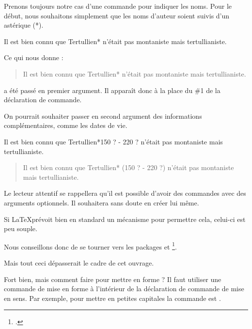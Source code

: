 Prenons toujours notre cas d'une commande pour indiquer les noms. Pour le début, nous souhaitons simplement que les noms d'auteur soient suivis d'un astérique (*).

\begin{latexcode}
\newcommand{\auteur}[1]{#1*}
Il est bien connu que \auteur{Tertullien} n'était pas montaniste
mais tertullianiste.
\end{latexcode}

\newcommand{\auteur}[1]{#1*}

Ce qui nous donne :

\begin{quotation}
Il est bien connu que \auteur{Tertullien} n'était pas montaniste mais tertullianiste.
\end{quotation}


 a été passé en premier argument. Il apparaît donc à la place du \#1 de la déclaration de commande.

On pourrait souhaiter passer en second argument des informations complémentaires, comme les dates de vie.

\begin{latexcode}
\newcommand{\auteur}[2]{#1* (#2)}
Il est bien connu que \auteur{Tertullien}{150 ? - 220 ?}
n'était pas montaniste mais tertullianiste.
\end{latexcode}

\renewcommand{\auteur}[2]{#1* (#2)}

\begin{quotation}
Il est bien connu que \auteur{Tertullien}{150 ? - 220 ?}
n'était pas montaniste mais tertullianiste.
\end{quotation}

\begin{plusloins}
Le lecteur attentif se rappellera  qu'il est possible d'avoir des commandes avec des arguments optionnels. Il souhaitera sans doute en créer lui même.

Si \LaTeX prévoit bien en standard un mécanisme pour permettre cela, celui-ci est  peu souple. 

Nous conseillons donc de se tourner vers les packages  et \footcites{xargs}{ifthen}.

Mais tout ceci dépasserait le cadre de cet ouvrage.
\end{plusloins}

Fort bien, mais comment faire pour mettre en forme ? Il faut  utiliser une commande de mise en forme à l'intérieur de la déclaration de commande de mise en sens. Par exemple, pour mettre en petites capitales la commande est .

